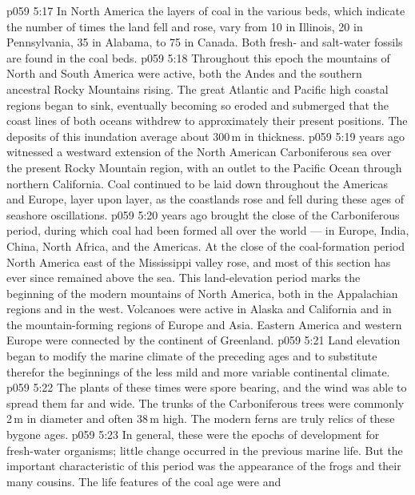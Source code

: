 \vs p059 5:17 In North America the layers of coal in the various beds, which indicate the number of times the land fell and rose, vary from 10 in Illinois, 20 in Pennsylvania, 35 in Alabama, to 75 in Canada. Both fresh\hyp{} and salt\hyp{}water fossils are found in the coal beds.
\vs p059 5:18 Throughout this epoch the mountains of North and South America were active, both the Andes and the southern ancestral Rocky Mountains rising. The great Atlantic and Pacific high coastal regions began to sink, eventually becoming so eroded and submerged that the coast lines of both oceans withdrew to approximately their present positions. The deposits of this inundation average about 300\,m in thickness.
\vs p059 5:19 \pc {} years ago witnessed a westward extension of the North American Carboniferous sea over the present Rocky Mountain region, with an outlet to the Pacific Ocean through northern California. Coal continued to be laid down throughout the Americas and Europe, layer upon layer, as the coastlands rose and fell during these ages of seashore oscillations.
\vs p059 5:20 \pc {} years ago brought the close of the Carboniferous period, during which coal had been formed all over the world --- in Europe, India, China, North Africa, and the Americas. At the close of the coal\hyp{}formation period North America east of the Mississippi valley rose, and most of this section has ever since remained above the sea. This land\hyp{}elevation period marks the beginning of the modern mountains of North America, both in the Appalachian regions and in the west. Volcanoes were active in Alaska and California and in the mountain\hyp{}forming regions of Europe and Asia. Eastern America and western Europe were connected by the continent of Greenland.
\vs p059 5:21 Land elevation began to modify the marine climate of the preceding ages and to substitute therefor the beginnings of the less mild and more variable continental climate.
\vs p059 5:22 The plants of these times were spore bearing, and the wind was able to spread them far and wide. The trunks of the Carboniferous trees were commonly 2\,m in diameter and often 38\,m high. The modern ferns are truly relics of these bygone ages.
\vs p059 5:23 In general, these were the epochs of development for fresh\hyp{}water organisms; little change occurred in the previous marine life. But the important characteristic of this period was the  appearance of the frogs and their many cousins. The life features of the coal age were  and 
